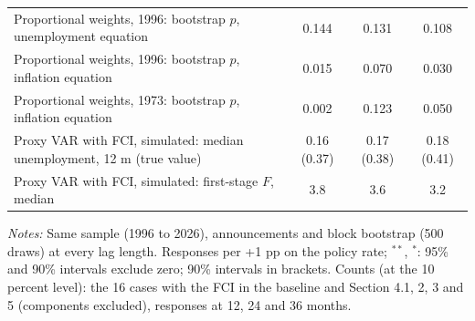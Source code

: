 \begin{table}[tp]
{\begin{tabular}{p{5.3cm}ccc}
Proportional weights, 1996: bootstrap $p$, unemployment equation & 0.144 & 0.131 & 0.108\\
Proportional weights, 1996: bootstrap $p$, inflation equation & 0.015 & 0.070 & 0.030\\
Proportional weights, 1973: bootstrap $p$, inflation equation & 0.002 & 0.123 & 0.050\\
Proxy VAR with FCI, simulated: median unemployment, 12 m (true value) & 0.16 (0.37) & 0.17 (0.38) & 0.18 (0.41)\\
Proxy VAR with FCI, simulated: first-stage $F$, median & 3.8 & 3.6 & 3.2\\
\bottomrule\end{tabular}}
\begin{flushleft}\footnotesize\textit{Notes:} Same sample (1996 to 2026), announcements and block bootstrap (500 draws) at every lag length. Responses per +1 pp on the policy rate; $^{**}$, $^{*}$: 95\% and 90\% intervals exclude zero; 90\% intervals in brackets. Counts (at the 10 percent level): the 16 cases with the FCI in the baseline and Section 4.1, 2, 3 and 5 (components excluded), responses at 12, 24 and 36 months.\end{flushleft}
\end{table}
